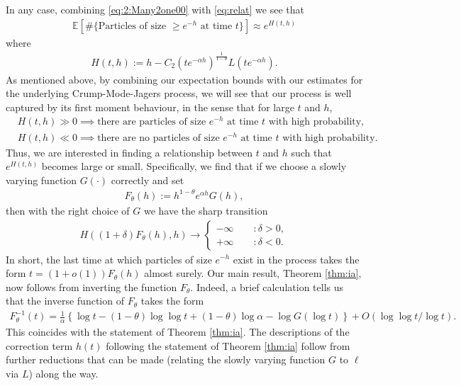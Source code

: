 \documentclass[a4,12pt]{amsart}
\numberwithin{equation}{section}
\begin{document}
In any case, combining \eqref{eq:2:Many2one00} with \eqref{eq:relat} we see that 
\begin{align*}
	\mathbb{E} \left[ \# \{ \text{Particles of size $\geq e^{-h}$ at time $t$} \}  \right] \approx  e^{H(t,h)}
\end{align*}
where
\begin{align*}
H(t,h) := h - C_2(te^{-\alpha h})^{\frac{1}{1-\theta}} L(t e^{ - \alpha h} ). 
\end{align*} 
As mentioned above, by combining our expectation bounds with our estimates for the underlying Crump-Mode-Jagers process, we will see that our process is well captured by its first moment behaviour, in the sense that for large $t$ and $h$,
\begin{align*}
&H(t,h) \gg 0 \implies \text{there are particles of size $e^{-h}$ at time $t$ with high probability,}\\
&H(t,h) \ll 0 \implies \text{there are no particles of size $e^{-h}$ at time $t$ with high probability}.
\end{align*}
Thus, we are interested in finding a relationship between $t$ and $h$ such that $e^{H(t,h)}$ becomes large or small. 
Specifically, we find that if we choose a slowly varying function $G(\cdot)$ correctly and set 
\begin{align*}
F_\theta(h) := h^{1-\theta}e^{\alpha h} G(h),
\end{align*}
then with the right choice of $G$ we have the sharp transition
\begin{align*}
H( (1+\delta)F_\theta(h),h) \to 
\begin{cases}
- \infty \qquad :\text{$\delta > 0$},\\
+ \infty \qquad :\text{$\delta < 0$}.
\end{cases}
\end{align*}
In short, the last time at which particles of size $e^{-h}$ exist in the process takes the form $t = (1+o(1))F_\theta(h)$ almost surely. Our main result, Theorem \ref{thm:ia}, now follows from inverting the function $F_\theta$. Indeed, a brief calculation tells us that the inverse function of $F_\theta$ takes the form
\begin{align*}
F_\theta^{-1}(t) = \frac{1}{\alpha} \left\{ \log t - (1-\theta) \log \log t + (1-\theta)\log \alpha - \log G( \log t ) \right\} + O(\log \log t/\log t).
\end{align*}
% 
This coincides with the statement of Theorem \ref{thm:ia}. The descriptions of the correction term $h(t)$ following the statement of Theorem \ref{thm:ia} follow from further reductions that can be made (relating the slowly varying function $G$ to $\ell$ via $L$) along the way.
\end{document}
